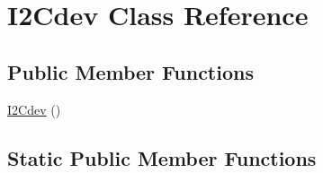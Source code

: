 \hypertarget{class_i2_cdev}{\section{I2\+Cdev Class Reference}
\label{class_i2_cdev}
}
\subsection*{Public Member Functions}
\begin{DoxyCompactItemize}
\item 
\hyperlink{class_i2_cdev_a0a466e2323d9f719a1ecc9fa11ac5c84}{I2\+Cdev} ()
\end{DoxyCompactItemize}
\subsection*{Static Public Member Functions}
